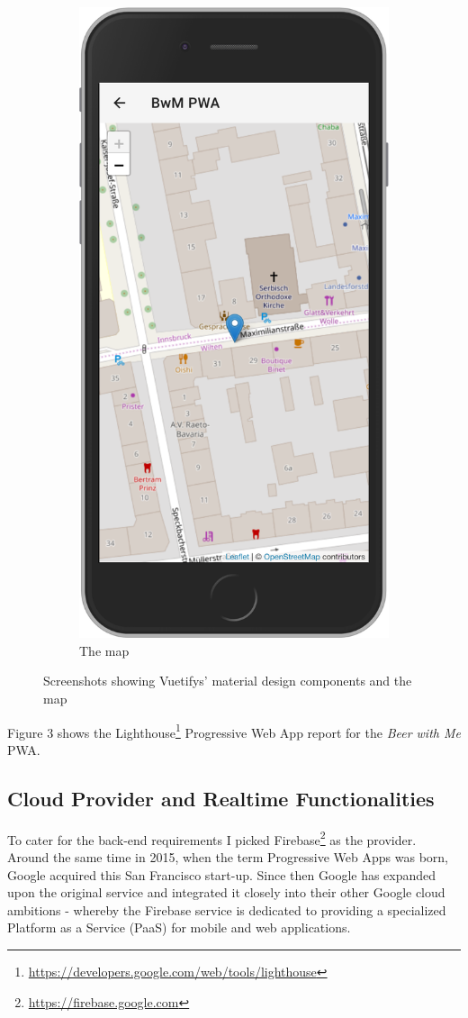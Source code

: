 \begin{figure}
\begin{subfigure}{.5\textwidth}
    \includegraphics[width=.7\linewidth]{img/screen03}
    \caption{The map}
    \label{fig:sub2}
  \end{subfigure}
  \caption{Screenshots showing Vuetifys' material design components and the map}
  \label{fig:test}
\end{figure}

Figure 3 shows the Lighthouse\footnote{\url{https://developers.google.com/web/tools/lighthouse}} Progressive Web App report for the \textit{Beer with Me} PWA.


\subsection{Cloud Provider and Realtime Functionalities}

To cater for the back-end requirements I picked Firebase\footnote{\url{https://firebase.google.com}} as the provider. Around the same time in 2015, when the term Progressive Web Apps was born, Google acquired this San Francisco start-up. Since then Google has expanded upon the original service and integrated it closely into their other Google cloud ambitions - whereby the Firebase service is dedicated to providing a specialized Platform as a Service (PaaS) for mobile and web applications.

